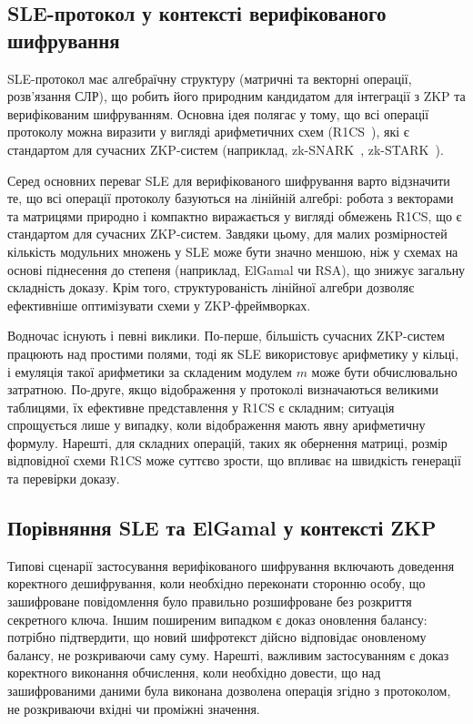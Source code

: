 \subsection{SLE-протокол у контексті верифікованого шифрування}\label{subsec:sle-----}

SLE-протокол має алгебраїчну структуру (матричні та векторні операції, розв'язання СЛР), що робить його природним кандидатом для інтеграції з ZKP та верифікованим шифруванням.
Основна ідея полягає у тому, що всі операції протоколу можна виразити у вигляді арифметичних схем (R1CS~\cite{ParnoEtAl13Pinocchio}), які є стандартом для сучасних ZKP-систем (наприклад, zk-SNARK~\cite{Groth16, BenSassonEtAl13}, zk-STARK~\cite{BenSassonEtAl18STARK}).

Серед основних переваг SLE для верифікованого шифрування варто відзначити те, що всі операції протоколу базуються на лінійній алгебрі: робота з векторами та матрицями природно і компактно виражається у вигляді обмежень R1CS, що є стандартом для сучасних ZKP-систем.
Завдяки цьому, для малих розмірностей кількість модульних множень у SLE може бути значно меншою, ніж у схемах на основі піднесення до степеня (наприклад, ElGamal чи RSA), що знижує загальну складність доказу.
Крім того, структурованість лінійної алгебри дозволяє ефективніше оптимізувати схеми у ZKP-фреймворках.

Водночас існують і певні виклики.
По-перше, більшість сучасних ZKP-систем працюють над простими полями, тоді як SLE використовує арифметику у кільці, і емуляція такої арифметики за складеним модулем $m$ може бути обчислювально затратною.
По-друге, якщо відображення у протоколі визначаються великими таблицями, їх ефективне представлення у R1CS є складним; ситуація спрощується лише у випадку, коли відображення мають явну арифметичну формулу.
Нарешті, для складних операцій, таких як обернення матриці, розмір відповідної схеми R1CS може суттєво зрости, що впливає на швидкість генерації та перевірки доказу.

\subsection{Порівняння SLE та ElGamal у контексті ZKP}\label{subsec:-sle--elgamal---zkp}

Типові сценарії застосування верифікованого шифрування включають доведення коректного дешифрування, коли необхідно переконати сторонню особу, що зашифроване повідомлення було правильно розшифроване без розкриття секретного ключа.
Іншим поширеним випадком є доказ оновлення балансу: потрібно підтвердити, що новий шифротекст дійсно відповідає оновленому балансу, не розкриваючи саму суму.
Нарешті, важливим застосуванням є доказ коректного виконання обчислення, коли необхідно довести, що над зашифрованими даними була виконана дозволена операція згідно з протоколом, не розкриваючи вхідні чи проміжні значення.

